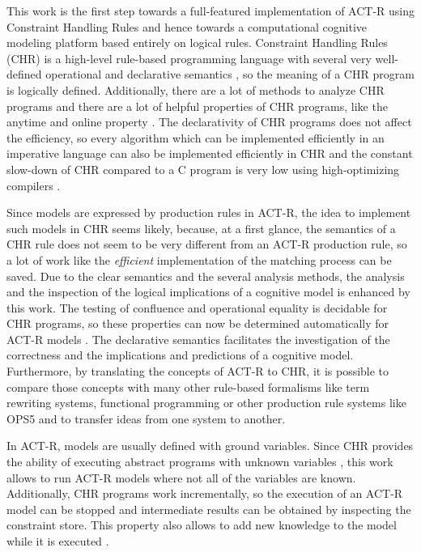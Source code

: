  This work is the first step towards a full-featured implementation of ACT-R using Constraint Handling Rules and hence towards a computational cognitive modeling platform based entirely on logical rules. Constraint Handling Rules (CHR) is a high-level rule-based programming language with several very well-defined operational and declarative semantics \cite[49\psqq]{fru_chr_book_2009}, so the meaning of a CHR program is logically defined. Additionally, there are a lot of methods to analyze CHR programs \cite[96\psqq]{fru_chr_book_2009} and there are a lot of helpful properties of CHR programs, like the anytime and online property \cite[83\psqq]{fru_chr_book_2009}. The declarativity of CHR programs does not affect the efficiency, so every algorithm which can be implemented efficiently in an imperative language can also be implemented efficiently in CHR and the constant slow-down of CHR compared to a C program is very low using high-optimizing compilers \cite[94]{fru_chr_book_2009}.

Since models are expressed by production rules in ACT-R, the idea to implement such models in CHR seems likely, because, at a first glance, the semantics of a CHR rule does not seem to be very different from an ACT-R production rule, so a lot of work like the \emph{efficient} implementation of the matching process can be saved. Due to the clear semantics and the several analysis methods, the analysis and the inspection of the logical implications of a cognitive model is enhanced by this work. The testing of confluence and operational equality is decidable for CHR programs, so these properties can now be determined automatically for ACT-R models \cite[4]{chr_lecture_chap6}. The declarative semantics facilitates the investigation of the correctness and the implications and predictions of a cognitive model. Furthermore, by translating the concepts of ACT-R to CHR, it is possible to compare those concepts with many other rule-based formalisms like term rewriting systems, functional programming or other production rule systems like OPS5 and to transfer ideas from one system to another\cite[141\psqq]{fru_chr_book_2009}. 

In ACT-R, models are usually defined with ground variables. Since CHR provides the ability of executing abstract programs with unknown variables \cite[4]{chr_lecture_chap6}, this work allows to run ACT-R models where not all of the variables are known. Additionally, CHR programs work incrementally, so the execution of an ACT-R model can be stopped and intermediate results can be obtained by inspecting the constraint store. This property also allows to add new knowledge to the model while it is executed \cite[176]{fru_chr_book_2009}.

